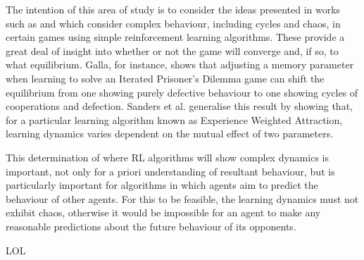 \documentclass[../sample.tex]{subfiles}
\begin{document}
    The intention of this area of study is to consider the ideas presented in works such as 
    \cite{Sanders2018} and \cite{Galla2011} which consider complex behaviour, including cycles and
    chaos, in certain games using simple reinforcement learning algorithms. These provide a great
    deal of insight into whether or not the game will converge and, if so, to what equilibrium.
    Galla, for instance, shows that adjusting a memory parameter when learning to solve an Iterated
    Prisoner's Dilemma game can shift the equilibrium from one showing purely defective behaviour to
    one showing cycles of cooperations and defection. Sanders et al. generalise this result by
    showing that, for a particular learning algorithm known as Experience Weighted Attraction,
    learning dynamics varies dependent on the mutual effect of two parameters. 

    This determination of where RL algorithms will show complex dynamics is important, not only for
    a priori understanding of resultant behaviour, but is particularly important for algorithms in
    which agents aim to predict the behaviour of other agents. For this to be feasible, the learning
    dynamics must not exhibit chaos, otherwise it would be impossible for an agent to make any
    reasonable predictions about the future behaviour of its opponents. 

    LOL
    
\end{document}

